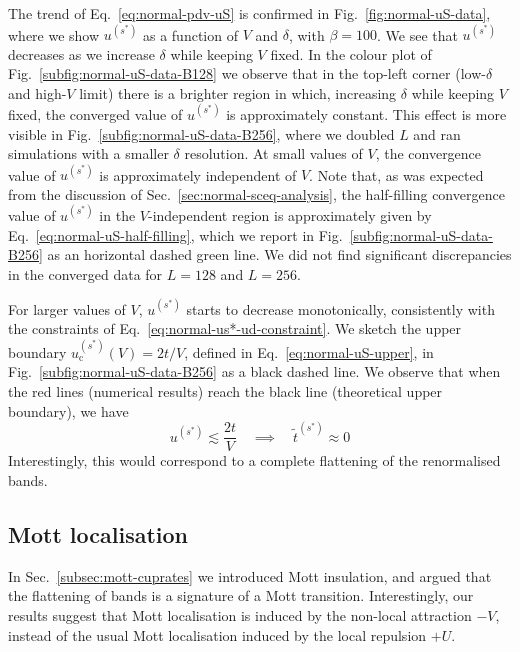 The trend of Eq.~\eqref{eq:normal-pdv-uS} is confirmed in  Fig.~\ref{fig:normal-uS-data}, where we show $u^{(s^*)}$ as a function of $V$ and $\delta$, with $\beta=100$. We see that  $u^{(s^*)}$ decreases as we increase $\delta$ while keeping $V$ fixed. In the colour plot of  Fig.~\ref{subfig:normal-uS-data-B128} we observe that in the top-left corner (low-$\delta$ and high-$V$ limit) there is a brighter region in which, increasing $\delta$ while keeping $V$ fixed, the converged value of $u^{(s^*)}$ is approximately constant. This effect is more visible in Fig.~\ref{subfig:normal-uS-data-B256}, where we doubled $L$ and ran simulations with a smaller $\delta$ resolution. At small values of $V$, the convergence value of $u^{(s^*)}$ is approximately independent of $V$. Note that, as was expected from the discussion of Sec.~\ref{sec:normal-sceq-analysis}, the half-filling convergence value of $u^{(s^*)}$ in the $V$-independent region is approximately given by Eq.~\eqref{eq:normal-uS-half-filling}, which we report in Fig.~\ref{subfig:normal-uS-data-B256} as an horizontal dashed green line. We did not find significant discrepancies in the converged data for $L=128$ and $L=256$.

For larger values of $V$, $u^{(s^*)}$ starts to decrease monotonically, consistently with the constraints of Eq.~\eqref{eq:normal-us*-ud-constraint}. We sketch the upper boundary $u^{(s^*)}_\mathrm{c}(V)=2t/V$, defined in Eq.~\eqref{eq:normal-uS-upper}, in Fig.~\ref{subfig:normal-uS-data-B256} as a black dashed line. We observe that when the red lines (numerical results) reach the black line (theoretical upper boundary), we have
\[
	u^{(s^*)} \lesssim \frac{2t}{V}
	\quad\implies\quad
	\tilde{t}^{(s^*)} \approx 0
\]
Interestingly, this would correspond to a complete flattening of the renormalised bands.

\subsection{Mott localisation}\label{subsec:normal-mott-numeric}

In Sec.~\ref{subsec:mott-cuprates} we introduced Mott insulation, and argued that the flattening of bands is a signature of a Mott transition. Interestingly, our results suggest that Mott localisation is induced by the non-local attraction $-V$, instead of the usual Mott localisation induced by the local repulsion $+U$. 

